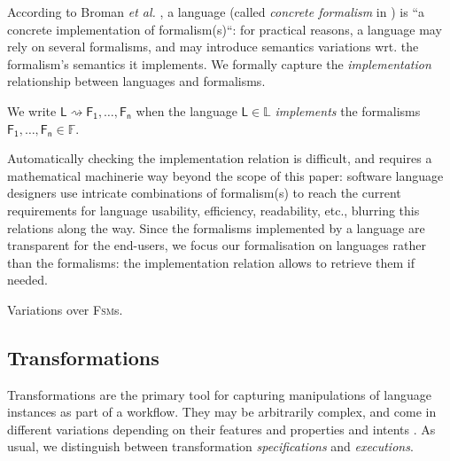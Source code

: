 According to Broman \emph{et al.} \cite{Broman-etAl:2012}, a language (called 
\emph{concrete formalism} in \cite{P:MPM:2006}) is ``a concrete implementation 
of formalism(s)``: for practical reasons, a language may rely on several 
formalisms, and may introduce semantics variations wrt. the formalism's 
semantics it implements. We formally capture the \emph{implementation} 
relationship between languages and formalisms.

\begin{Definition}
   We write $\mathsf{L} \rightsquigarrow \mathsf{F_1}, \ldots, \mathsf{F_n}$ 
when the language $\mathsf{L}\in\mathbb{L}$ \emph{implements} the formalisms 
$\mathsf{F_1}, \ldots, \mathsf{F_n}\in\mathbb{F}$.
\end{Definition}
Automatically checking the implementation relation is difficult, and requires a 
mathematical machinerie way beyond the scope of this paper: software language 
designers use intricate combinations of formalism(s) to reach the current 
requirements for language usability, efficiency, readability, etc., blurring 
this relations along the way. 
Since the formalisms implemented by a language are transparent for the 
end-users, we focus our formalisation on languages rather than the formalisms: 
the implementation relation allows to retrieve them if needed.

\begin{Example}{Variations over \textsc{Fsm}s.}
   
\end{Example}



\subsection{Transformations}
\label{sec:Formalisation-Transformation}

Transformations are the primary tool for capturing manipulations of language 
instances as part of a workflow. They may be arbitrarily complex, and come in 
different variations depending on their features \cite{J:Mens-VonGorp:2006} and 
properties and intents \cite{J:Lucio-Amrani-etAl:2014}. As usual, we 
distinguish between transformation \emph{specifications} and \emph{executions}.

